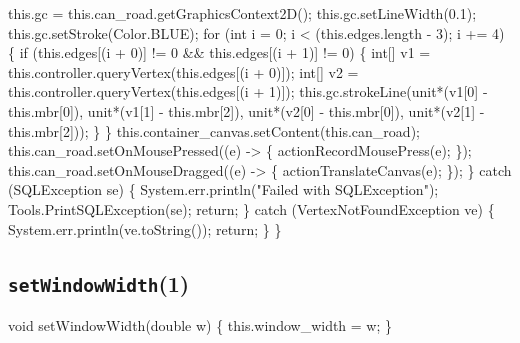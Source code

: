     this.gc = this.can_road.getGraphicsContext2D();
    this.gc.setLineWidth(0.1);
    this.gc.setStroke(Color.BLUE);
    for (int i = 0; i < (this.edges.length - 3); i += 4) \{
      if (this.edges[(i + 0)] != 0 && this.edges[(i + 1)] != 0) \{
        int[] v1 = this.controller.queryVertex(this.edges[(i + 0)]);
        int[] v2 = this.controller.queryVertex(this.edges[(i + 1)]);
        this.gc.strokeLine(unit*(v1[0] - this.mbr[0]), unit*(v1[1] - this.mbr[2]),
                           unit*(v2[0] - this.mbr[0]), unit*(v2[1] - this.mbr[2]));
      \}
    \}
    this.container_canvas.setContent(this.can_road);
    this.can_road.setOnMousePressed((e) -> \{ actionRecordMousePress(e); \});
    this.can_road.setOnMouseDragged((e) -> \{ actionTranslateCanvas(e); \});
  \} catch (SQLException se) \{
    System.err.println("Failed with SQLException");
    Tools.PrintSQLException(se);
    return;
  \} catch (VertexNotFoundException ve) \{
    System.err.println(ve.toString());
    return;
  \}
\}
\eatline
{}\nwendcode{}\nwdocspar
\subsection{\texttt{setWindowWidth}(1)}
\nwenddocs{}\endmoddef{}
void setWindowWidth(double w) \{
  this.window_width = w;
\}
\eatline
{}\nwendcode{}\nwdocspar
